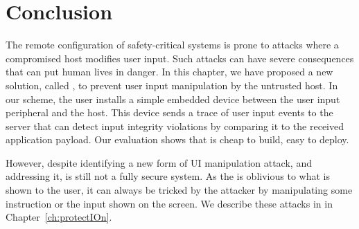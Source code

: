 
\section{Conclusion}
\label{sec:conclusion_IK}

The remote configuration of safety-critical systems is prone to attacks where a compromised host modifies user input. Such attacks can have severe consequences that can put human lives in danger. In this chapter, we have proposed a new solution, called \name, to prevent user input manipulation by the untrusted host. In our scheme, the user installs a simple embedded device between the user input peripheral and the host. This device sends a trace of user input events to the server that can detect input integrity violations by comparing it to the received application payload. Our evaluation shows that \name is cheap to build, easy to deploy.

However, despite identifying a new form of UI manipulation attack, and addressing it, \integrikey is still not a fully secure system. As the \device is oblivious to what is shown to the user, it can always be tricked by the attacker by manipulating some instruction or the input shown on the screen. We describe these attacks in \protection in Chapter~\ref{ch:protectIOn}.
